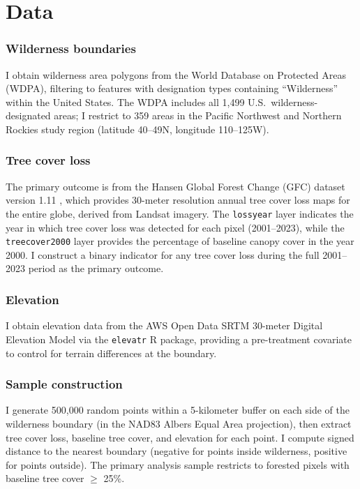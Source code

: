 \documentclass[12pt]{article}
\begin{document}
\section{Data}

\subsubsection*{Wilderness boundaries} I obtain wilderness area polygons from the World Database on Protected Areas (WDPA), filtering to features with designation types containing ``Wilderness'' within the United States. The WDPA includes all 1,499 U.S.\ wilderness-designated areas; I restrict to 359 areas in the Pacific Northwest and Northern Rockies study region (latitude 40\textdegree--49\textdegree N, longitude 110\textdegree--125\textdegree W).

\subsubsection*{Tree cover loss} The primary outcome is from the Hansen Global Forest Change (GFC) dataset version 1.11 \citep{Hansen2013}, which provides 30-meter resolution annual tree cover loss maps for the entire globe, derived from Landsat imagery. The \texttt{lossyear} layer indicates the year in which tree cover loss was detected for each pixel (2001--2023), while the \texttt{treecover2000} layer provides the percentage of baseline canopy cover in the year 2000. I construct a binary indicator for any tree cover loss during the full 2001--2023 period as the primary outcome.

\subsubsection*{Elevation} I obtain elevation data from the AWS Open Data SRTM 30-meter Digital Elevation Model via the \texttt{elevatr} R package, providing a pre-treatment covariate to control for terrain differences at the boundary.

\subsubsection*{Sample construction} I generate 500,000 random points within a 5-kilometer buffer on each side of the wilderness boundary (in the NAD83 Albers Equal Area projection), then extract tree cover loss, baseline tree cover, and elevation for each point. I compute signed distance to the nearest boundary (negative for points inside wilderness, positive for points outside). The primary analysis sample restricts to forested pixels with baseline tree cover $\geq$ 25\%.
\end{document}
